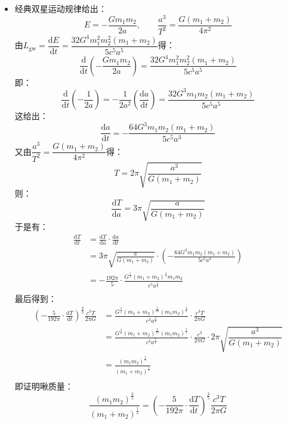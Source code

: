 \documentclass[a4paper,fontset=none]{ctexart}
\begin{document}
\begin{itemize}
        \item[\textbf{补充题}]
        经典双星运动规律给出：
        \[
        E = -\frac{Gm_1 m_2}{2a},\qquad \frac{a^3}{T^2} = \frac{G(m_1 + m_2)}{4\pi^2}
        \]
        由$L_{\mathrm{gw}} = \dfrac{\mathrm{d}E}{\mathrm{d}t} = \dfrac{32 G^4 m_1^2 m_2^2 (m_1 + m_2)}{5c^5 a^5}$得：
        \[
        \frac{\mathrm{d}}{\mathrm{d}t}\left(-\frac{Gm_1 m_2}{2a}\right) = \frac{32 G^4 m_1^2 m_2^2 (m_1 + m_2)}{5c^5 a^5}
        \]
        即：
        \[
        \frac{\mathrm{d}}{\mathrm{d}t}\left(-\frac{1}{2a}\right) = -\frac{1}{2a^2}\left(\frac{\mathrm{d}a}{\mathrm{d}t}\right) = \frac{32 G^3 m_1 m_2 (m_1 + m_2)}{5c^5 a^5}
        \]
        这给出：
        \[
        \frac{\mathrm{d}a}{\mathrm{d}t} = -\frac{64 G^3 m_1 m_2 (m_1 + m_2)}{5c^5 a^3}
        \]
        又由$\dfrac{a^3}{T^2} = \dfrac{G(m_1 + m_2)}{4\pi^2}$得：
        \[
        T = 2\pi\sqrt{\frac{a^3}{G(m_1 + m_2)}}
        \]
        则：
        \[
        \frac{\mathrm{d}T}{\mathrm{d}a} = 3\pi\sqrt{\frac{a}{G(m_1 + m_2)}}
        \]
        于是有：
        \begin{align*}
            \frac{\mathrm{d}T}{\mathrm{d}t}
            &= \frac{\mathrm{d}T}{\mathrm{d}a} \cdot \frac{\mathrm{d}a}{\mathrm{d}t} \\
            &= 3\pi\sqrt{\frac{a}{G(m_1 + m_2)}} \cdot \left(-\frac{64 G^3 m_1 m_2 (m_1 + m_2)}{5c^5 a^3}\right) \\
            &= -\frac{192\pi}{5} \cdot \frac{G^{\tfrac{5}{2}} (m_1 + m_2)^{\tfrac{1}{2}} m_1 m_2}{c^5 a^{\tfrac{5}{2}}} \\
        \end{align*}
        最后得到：
        \begin{align*}
            \left(-\frac{5}{192\pi} \cdot \frac{\mathrm{d}T}{\mathrm{d}t}\right)^{\tfrac{3}{5}}\frac{c^3 T}{2\pi G}
            &= \frac{G^{\tfrac{3}{2}} (m_1 + m_2)^{\tfrac{3}{10}} (m_1 m_2)^\tfrac{3}{5}}{c^3 a^{\tfrac{3}{2}}} \cdot \frac{c^3 T}{2\pi G} \\
            &= \frac{G^{\tfrac{3}{2}} (m_1 + m_2)^{\tfrac{3}{10}} (m_1 m_2)^\frac{3}{5}}{c^3 a^{\tfrac{3}{2}}} \cdot \frac{c^3}{2\pi G} \cdot 2\pi\sqrt{\dfrac{a^3}{G(m_1 + m_2)}} \\
            &= \frac{(m_1 m_2)^{\tfrac{3}{5}}}{(m_1 + m_2)^{\tfrac{1}{5}}} \\
        \end{align*}
        即证明啾质量：
        \[
        \frac{(m_1 m_2)^{\tfrac{3}{5}}}{(m_1 + m_2)^{\tfrac{1}{5}}} = \left(-\frac{5}{192\pi} \cdot \frac{\mathrm{d}T}{\mathrm{d}t}\right)^{\tfrac{3}{5}}\frac{c^3 T}{2\pi G}
        \]

    \end{itemize}
\end{document}
